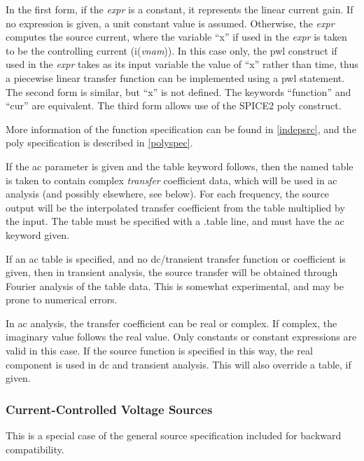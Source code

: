 In the first form, if the {\it expr} is a constant, it represents the
linear current gain.  If no expression is given, a unit constant
value is assumed.  Otherwise, the {\it expr} computes the source
current, where the variable ``{\vt x}'' if used in the {\it expr} is
taken to be the controlling current (i({\it vnam\/})).  In this case
only, the {\vt pwl} construct if used in the {\it expr} takes as its
input variable the value of ``{\vt x}'' rather than time, thus a
piecewise linear transfer function can be implemented using a {\vt
pwl} statement.  The second form is similar, but ``{\vt x}'' is not
defined.  The keywords ``{\vt function}'' and ``{\vt cur}'' are
equivalent.  The third form allows use of the SPICE2 {\vt poly}
construct.

More information of the function specification can be found in
\ref{indepsrc}, and the {\vt poly} specification is described in
\ref{polyspec}.

If the {\vt ac} parameter is given and the {\vt table} keyword
follows, then the named table is taken to contain complex {\it
transfer} coefficient data, which will be used in ac analysis (and
possibly elsewhere, see below).  For each frequency, the source output
will be the interpolated transfer coefficient from the table
multiplied by the input.  The table must be specified with a {\vt
.table} line, and must have the {\vt ac} keyword given.

If an ac table is specified, and no dc/transient transfer function or
coefficient is given, then in transient analysis, the source transfer
will be obtained through Fourier analysis of the table data.  This is
somewhat experimental, and may be prone to numerical errors.

In ac analysis, the transfer coefficient can be real or complex.  If
complex, the imaginary value follows the real value.  Only constants
or constant expressions are valid in this case.  If the source
function is specified in this way, the real component is used in dc
and transient analysis.  This will also override a table, if given.

\subsubsection{Current-Controlled Voltage Sources}


This is a special case of the general source specification included
for backward compatibility.

